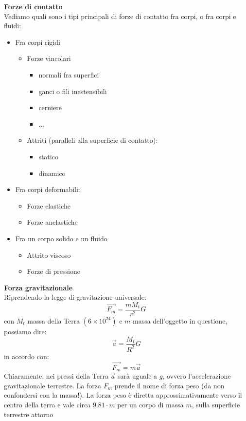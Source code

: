\documentclass[a4paper,12pt]{article}
\begin{document}
\textbf{Forze di contatto} \\
Vediamo quali sono i tipi principali di forze di contatto fra corpi, o fra corpi e fluidi:
\begin{itemize}
  \item Fra corpi rigidi
    \begin{itemize}
      \item Forze vincolari
        \begin{itemize}
          \item normali fra superfici
          \item ganci o fili inestensibili
          \item cerniere
          \item ...
        \end{itemize}
      \item Attriti (paralleli alla superficie di contatto):
        \begin{itemize}
      \item statico
      \item dinamico
    \end{itemize}
    \end{itemize}
  \item Fra corpi deformabili:
    \begin{itemize}
      \item Forze elastiche
      \item Forze anelastiche
    \end{itemize}
  \item Fra un corpo solido e un fluido
    \begin{itemize}
      \item Attrito viscoso
      \item Forze di pressione
    \end{itemize}
\end{itemize}
\par\smallskip
\textbf{Forza gravitazionale} \\
Riprendendo la legge di gravitazione universale:
$$ \vec{F_m} = \frac{mM_t}{r^2}G $$
con $M_t$ massa della Terra $(6\times 10^{24})$ e $m$ massa dell'oggetto in questione, possiamo dire:
$$ \vec{a} = \frac{M_t}{R^2}G $$
in accordo con:
$$ \vec{F_m} = m\vec{a} $$
Chiaramente, nei pressi della Terra $\vec{a}$ sarà uguale a $g$, ovvero l'accelerazione gravitazionale terrestre.
La forza $F_m$ prende il nome di forza peso (da non confondersi con la massa!). La forza peso è diretta approssimativamente
verso il centro della terra e vale circa $9.81\cdot m$ per un corpo di massa $m$, sulla superficie terrestre attorno
\end{document}
